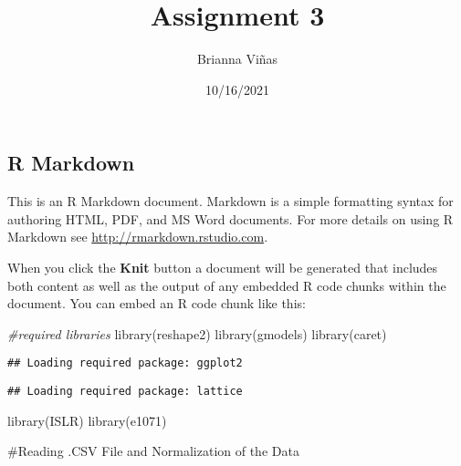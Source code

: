 \documentclass[
]{article}
\title{Assignment 3}
\author{Brianna Viñas}
\date{10/16/2021}
\newenvironment{Shaded}{\begin{snugshade}}{\end{snugshade}}
\newcommand{\CommentTok}[1]{\textcolor[rgb]{0.56,0.35,0.01}{\textit{#1}}}
\newcommand{\FunctionTok}[1]{\textcolor[rgb]{0.00,0.00,0.00}{#1}}
\newcommand{\NormalTok}[1]{#1}
\newcommand{\OtherTok}[1]{\textcolor[rgb]{0.56,0.35,0.01}{#1}}
\newcommand{\SpecialCharTok}[1]{\textcolor[rgb]{0.00,0.00,0.00}{#1}}
\newcommand{\StringTok}[1]{\textcolor[rgb]{0.31,0.60,0.02}{#1}}
\begin{document}
\maketitle

\hypertarget{r-markdown}{%
\subsection{R Markdown}\label{r-markdown}}

This is an R Markdown document. Markdown is a simple formatting syntax
for authoring HTML, PDF, and MS Word documents. For more details on
using R Markdown see \url{http://rmarkdown.rstudio.com}.

When you click the \textbf{Knit} button a document will be generated
that includes both content as well as the output of any embedded R code
chunks within the document. You can embed an R code chunk like this:

\begin{Shaded}
\begin{Highlighting}[]
\CommentTok{\#required libraries }
\FunctionTok{library}\NormalTok{(reshape2)}
\FunctionTok{library}\NormalTok{(gmodels)}
\FunctionTok{library}\NormalTok{(caret)}
\end{Highlighting}
\end{Shaded}

\begin{verbatim}
## Loading required package: ggplot2
\end{verbatim}

\begin{verbatim}
## Loading required package: lattice
\end{verbatim}

\begin{Shaded}
\begin{Highlighting}[]
\FunctionTok{library}\NormalTok{(ISLR)}
\FunctionTok{library}\NormalTok{(e1071)}
\end{Highlighting}
\end{Shaded}

\#Reading .CSV File and Normalization of the Data

\begin{Shaded}
\end{Shaded}
\end{document}

